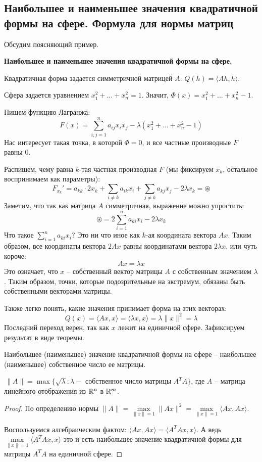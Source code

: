 \subsection{Наибольшее и наименьшее значения квадратичной формы на сфере. Формула для нормы матриц}
Обсудим поясняющий пример.

\textbf{Наибольшее и наименьшее значения квадратичной формы на сфере.}

    Квадратичная форма задается симметричной матрицей $A$: $Q(h) = \langle Ah, h \rangle$.

    Сфера задается уравнением $x_1^2 + \dots + x_n^2 = 1$.
    Значит, $\Phi(x) = x_1^2 + \dots + x_n^2 - 1$.

    Пишем функцию Лагранжа: \[ F(x) = \sum_{i, j = 1}^n a_{ij}x_ix_j - \lambda(x_1^2 + \dots + x_n^2 - 1) \]
    Нас интересует такая точка, в которой $\Phi = 0$, и все частные производные $F$ равны 0.

    Распишем, чему равна $k$-тая частная производная $F$ (мы фиксируем $x_k$, остальное воспринимаем как параметры): \[ F_{x_k}' = a_{kk} \cdot 2x_k + \sum_{i\neq k} a_{ik}x_i + \sum_{j \neq k} a_{kj}x_j -2\lambda x_k = \circledast \]
    Заметим, что так как матрица $A$ симметричная, выражение можно упростить: \[ \circledast = 2\sum_{i = 1}^n a_{ki}x_i - 2\lambda x_k \]
    Что такое $\sum\limits_{i = 1}^n a_{ki}x_i$? 
    Это ни что иное как $k$-ая координата вектора $Ax$. 
    Таким образом, все координаты вектора $2Ax$ равны координатами вектора $2\lambda x$, или чуть короче: \[ Ax = \lambda x \]
    Это означает, что $x$ -- собственный вектор матрицы $A$ с собственным значением $\lambda$.
    Таким образом, точки, которые подозрительные на экстремум, обязаны быть собственными векторами матрицы.
    
    Также легко понять, какие значения принимает форма на этих векторах: \[ Q(x) = \langle Ax, x \rangle = \langle \lambda x, x \rangle = \lambda \| x \|^2 = \lambda  \]
    Последний переход верен, так как $x$ лежит на единичной сфере.
    Зафиксируем результат в виде теоремы.

\begin{theorem}
    Наибольшее (наименьшее) значение квадратичной формы на сфере -- наибольшее (наименьшее) собственное число ее матрицы.
\end{theorem}

\vspace*{6mm}

\follow $\, \| A \| = \max \{ \sqrt{\lambda} : \lambda - \text{ собственное число матрицы } A^TA \}$, где $A$ -- матрица линейного отображения из $\mathbb{R}^n$ в $\mathbb{R}^m$.
\begin{proof}
    По определению нормы $\|A\| = \max\limits_{\|x\| = 1} \|Ax\|^2 = \max\limits_{\|x\| = 1} \langle Ax, Ax \rangle$.
    
    Воспользуемся алгебраическим фактом: $\langle Ax, Ax \rangle = \langle A^TAx, x \rangle$.
    А ведь $\max\limits_{\|x\| = 1} \langle A^TAx, x \rangle$ это и есть наибольшее значение квадратичной формы для матрицы $A^TA$ на единичной сфере.
\end{proof}
